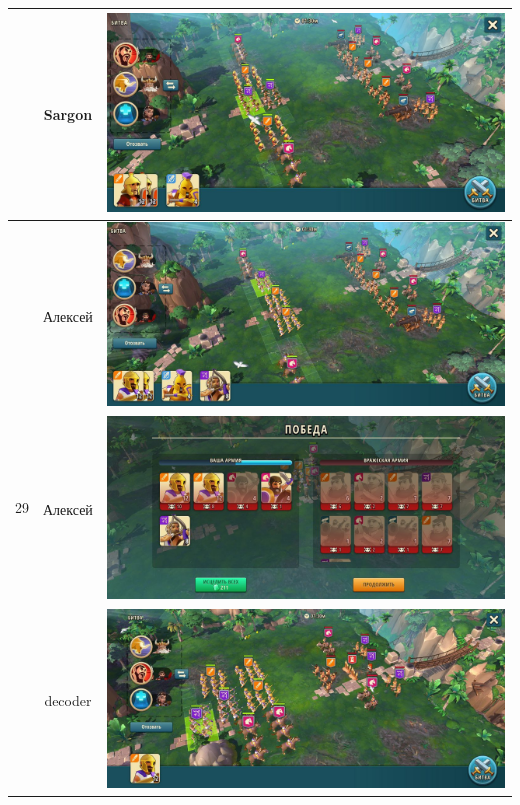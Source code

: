 \begin{longtable}{|c|c|c|}
    & Sargon &
    \includegraphics[width=0.75\linewidth]{./parts/media/TreasureHunt/29/sargon/photo_2022-04-07_10-02-57.jpg} \\
    \hline
    \multirow{6}{*}{29} & Алексей &
    \includegraphics[width=0.75\linewidth]{./parts/media/TreasureHunt/29/alexey/photo_2022-04-07_13-18-00.jpg} \\
    & Алексей &
    \includegraphics[width=0.75\linewidth]{./parts/media/TreasureHunt/29/alexey/photo_2022-04-07_13-17-44.jpg} \\
    \hline
    \multirow{10}{*}{30} & decoder &
    \includegraphics[width=0.75\linewidth]{./parts/media/TreasureHunt/30/decoder/photo_2022-04-07_09-59-28.jpg} \\

\end{longtable}
